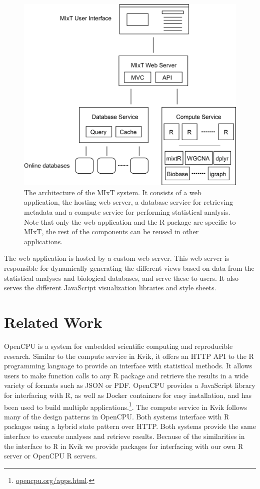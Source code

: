 \begin{figure}[h!]
\centering
\includegraphics[scale=0.4]{figures/mixt-architecture.png}
\caption{The architecture of the MIxT system. It consists of
a web application, the hosting web server, a database service for retrieving
metadata and a compute service for performing statistical analysis. Note that
only the web application and the R package are specific to MIxT, the rest of the
components can be reused in other applications.} 
\label{kvik-mixt}
\end{figure} 

The web application is hosted by a custom web server. This web server is
responsible for dynamically generating the different views based on data from
the statistical analyses and biological databases, and serve these to users. It
also serves the different JavaScript visualization libraries and style sheets. 

\section{Related Work} 
OpenCPU is a system for embedded scientific computing and reproducible
research.\cite{opencpu} Similar to the compute service in Kvik, it offers an
HTTP API to the R programming language to provide an interface with statistical
methods. It allows users to make function calls to any R package and retrieve
the results in a wide variety of formats such as JSON or PDF. 
OpenCPU provides a JavaScript library for interfacing with R, as well as Docker
containers for easy installation, and has been used to build multiple
applications.\footnote{\url{opencpu.org/apps.html}.}. The compute service in
Kvik follows many of the design patterns in OpenCPU. Both systems interface with
R packages using a hybrid state pattern over HTTP. Both systems provide the same
interface to execute analyses and retrieve results.  Because of the similarities
in the interface to R in Kvik we provide packages for interfacing with our own R
server or OpenCPU R servers.

